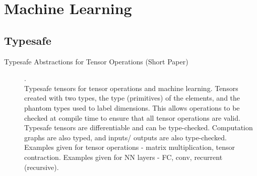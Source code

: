 \chapter {Machine Learning}

\section {Typesafe}

\begin{description}
    \item[Typesafe Abstractions for Tensor Operations (Short Paper)] {\cite{chen2017typesafe}. \\ Typesafe tensors for tensor operations and machine learning. Tensors created with two types, the type (primitives) of the elements, and the phantom types used to label dimensions. This allows operations to be checked at compile time to ensure that all tensor operations are valid. Typesafe tensors are differentiable and can be type-checked. Computation graphs are also typed, and inputs/ outputs are also type-checked. Examples given for tensor operations - matrix multiplication, tensor contraction. Examples given for NN layers - FC, conv, recurrent (recursive).}
\end{description}
